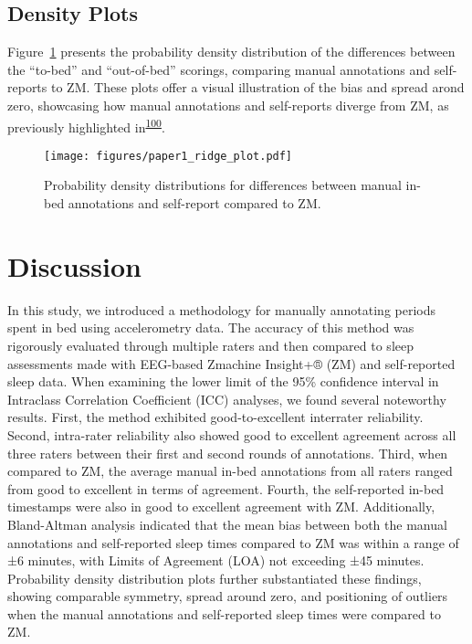 \documentclass[
  10pt,
]{scrbook}
\begin{document}
\hypertarget{density-plots}{%
\subsection{Density Plots}\label{density-plots}}

Figure~\ref{fig-ridge_plot} presents the probability density
distribution of the differences between the ``to-bed'' and
``out-of-bed'' scorings, comparing manual annotations and self-reports
to ZM. These plots offer a visual illustration of the bias and spread
arond zero, showcasing how manual annotations and self-reports diverge
from ZM, as previously highlighted
in\textsuperscript{\protect\hyperlink{ref-van_hees_estimating_2018}{100}}.

\begin{figure}

{\centering \texttt{[image: figures/paper1\_ridge\_plot.pdf]}

}

\caption{\label{fig-ridge_plot}Probability density distributions for
differences between manual in-bed annotations and self-report compared
to ZM.}

\end{figure}

\hypertarget{discussion}{%
\section{Discussion}\label{discussion}}

In this study, we introduced a methodology for manually annotating
periods spent in bed using accelerometry data. The accuracy of this
method was rigorously evaluated through multiple raters and then
compared to sleep assessments made with EEG-based Zmachine Insight+®
(ZM) and self-reported sleep data. When examining the lower limit of the
95\% confidence interval in Intraclass Correlation Coefficient (ICC)
analyses, we found several noteworthy results. First, the method
exhibited good-to-excellent interrater reliability. Second, intra-rater
reliability also showed good to excellent agreement across all three
raters between their first and second rounds of annotations. Third, when
compared to ZM, the average manual in-bed annotations from all raters
ranged from good to excellent in terms of agreement. Fourth, the
self-reported in-bed timestamps were also in good to excellent agreement
with ZM. Additionally, Bland-Altman analysis indicated that the mean
bias between both the manual annotations and self-reported sleep times
compared to ZM was within a range of ±6 minutes, with Limits of
Agreement (LOA) not exceeding ±45 minutes. Probability density
distribution plots further substantiated these findings, showing
comparable symmetry, spread around zero, and positioning of outliers
when the manual annotations and self-reported sleep times were compared
to ZM.
\end{document}
